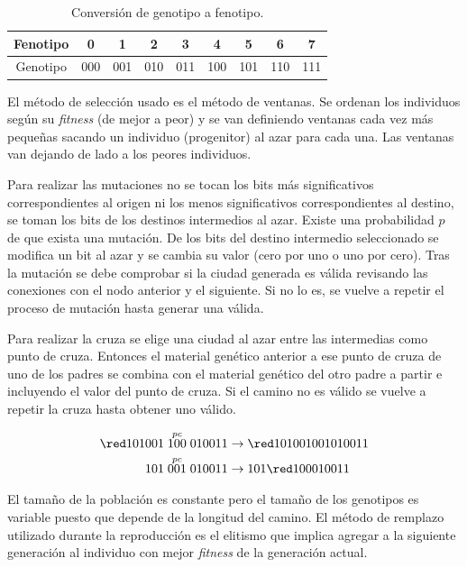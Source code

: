 \documentclass[conference,a4paper,10pt,oneside,final]{tfmpd}
\begin{document}
\begin{table}[!h]
\begin{tabular}[c]{|c|c|c|c|c|c|c|c|c|} \hline
Fenotipo & 0   & 1   & 2   & 3   & 4   & 5   & 6   & 7   \\ \hline
Genotipo & 000 & 001 & 010 & 011 & 100 & 101 & 110 & 111 \\ \hline
\end{tabular}
\caption{Conversión de genotipo a fenotipo.}
\label{table:gtof}
\end{table}

El método de selección usado es el método de ventanas. Se ordenan los individuos según su \textit{fitness} (de mejor a peor) y se van definiendo ventanas cada vez más pequeñas sacando un individuo (progenitor) al azar para cada una. Las ventanas van dejando de lado a los peores individuos.

Para realizar las mutaciones no se tocan los bits más significativos correspondientes al origen ni los menos significativos correspondientes al destino, se toman los bits de los destinos intermedios al azar. Existe una probabilidad $p$ de que exista una mutación. De los bits del destino intermedio seleccionado se modifica un bit al azar y se cambia su valor (cero por uno o uno por cero). Tras la mutación se debe comprobar si la ciudad generada es válida revisando las conexiones con el nodo anterior y el siguiente. Si no lo es, se vuelve a repetir el proceso de mutación hasta generar una válida.

Para realizar la cruza se elige una ciudad al azar entre las intermedias como punto de cruza. Entonces el material genético anterior a ese punto de cruza de uno de los padres se combina con el material genético del otro padre a partir e incluyendo el valor del punto de cruza. Si el camino no es válido se vuelve a repetir la cruza hasta obtener uno válido.

\begin{align*}
{\red 101 001 \stackrel{pc}{100} 010 011} &\rightarrow 
{\red 101 001} 001 010 011 \\
101 \stackrel{pc}{001} 010 011 &\rightarrow
101 {\red 100 010 011}
\end{align*}

El tamaño de la población es constante pero el tamaño de los genotipos es variable puesto que depende de la longitud del camino. El método de remplazo utilizado durante la reproducción es el elitismo que implica agregar a la siguiente generación al individuo con mejor \textit{fitness} de la generación actual.
\end{document}

